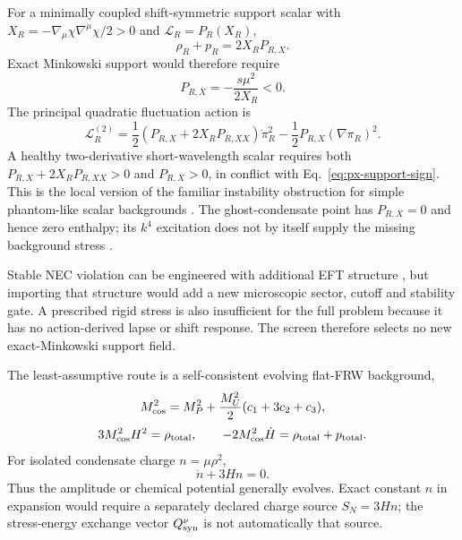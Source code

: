 For a minimally coupled shift-symmetric support scalar with
$X_R=-\nabla_\mu\chi\nabla^\mu\chi/2>0$ and
$\mathcal L_R=P_R(X_R)$,
\begin{equation}
 \rho_R+p_R=2X_RP_{R,X}.
 \label{eq:px-support-enthalpy}
\end{equation}
Exact Minkowski support would therefore require
\begin{equation}
 P_{R,X}=-\frac{s\mu^2}{2X_R}<0.
 \label{eq:px-support-sign}
\end{equation}
The principal quadratic fluctuation action is
\begin{equation}
 \mathcal L_R^{(2)}
 =\frac12(P_{R,X}+2X_RP_{R,XX})\dot\pi_R^2
 -\frac12P_{R,X}(\nabla\pi_R)^2.
 \label{eq:px-support-quadratic}
\end{equation}
A healthy two-derivative short-wavelength scalar requires both
$P_{R,X}+2X_RP_{R,XX}>0$ and $P_{R,X}>0$, in conflict with
Eq.~\eqref{eq:px-support-sign}.  This is the local version of the familiar
instability obstruction for simple phantom-like scalar backgrounds
\cite{vikman2005}.  The ghost-condensate point has $P_{R,X}=0$ and hence zero
enthalpy; its $k^4$ excitation does not by itself supply the missing
background stress \cite{arkani-hamed2004}.

Stable NEC violation can be engineered with additional EFT structure
\cite{creminelli2006}, but importing that structure would add a new
microscopic sector, cutoff and stability gate.  A prescribed rigid stress is
also insufficient for the full problem because it has no action-derived
lapse or shift response.  The screen therefore selects no new exact-Minkowski
support field.

The least-assumptive route is a self-consistent evolving flat-FRW background,
\begin{equation}
 M_{\rm cos}^2=M_P^2+\frac{M_U^2}{2}(c_1+3c_2+c_3),
 \label{eq:cosmological-planck-mass}
\end{equation}
\begin{equation}
 3M_{\rm cos}^2H^2=\rho_{\rm total},\qquad
 -2M_{\rm cos}^2\dot H=\rho_{\rm total}+p_{\rm total}.
 \label{eq:selected-frw-background}
\end{equation}
For isolated condensate charge $n=\mu\rho^2$,
\begin{equation}
 \dot n+3Hn=0.
 \label{eq:condensate-charge-dilution}
\end{equation}
Thus the amplitude or chemical potential generally evolves.  Exact constant
$n$ in expansion would require a separately declared charge source
$S_N=3Hn$; the stress-energy exchange vector $Q_{\rm syn}^{\nu}$ is not
automatically that source.

